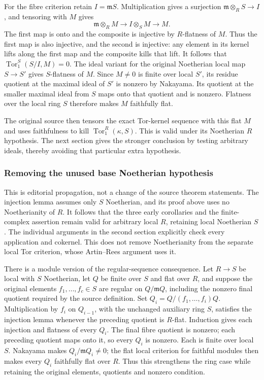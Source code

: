 For the fibre criterion retain \(I=\mathfrak mS\). Multiplication gives a surjection \(\mathfrak m\otimes_RS\to I\), and tensoring with \(M\) gives \[
\mathfrak m\otimes_RM\longrightarrow I\otimes_SM\longrightarrow M.
\] The first map is onto and the composite is injective by \(R\)-flatness of \(M\). Thus the first map is also injective, and the second is injective: any element in its kernel lifts along the first map and the composite kills that lift. It follows that \(\operatorname{Tor}_1^S(S/I,M)=0\). The ideal variant for the original Noetherian local map \(S\to S'\) gives \(S\)-flatness of \(M\). Since \(M\ne0\) is finite over local \(S'\), its residue quotient at the maximal ideal of \(S'\) is nonzero by Nakayama. Its quotient at the smaller maximal ideal from \(S\) maps onto that quotient and is nonzero. Flatness over the local ring \(S\) therefore makes \(M\) faithfully flat.

The original source then tensors the exact Tor-kernel sequence with this flat \(M\) and uses faithfulness to kill \(\operatorname{Tor}_1^R(\kappa,S)\). This is valid under its Noetherian \(R\) hypothesis. The next section gives the stronger conclusion by testing arbitrary ideals, thereby avoiding that particular extra hypothesis.

\subsubsection{Removing the unused base Noetherian hypothesis}\label{algebra-proof-016-removing-the-unused-base-noetherian-hypothesis}

This is editorial propagation, not a change of the source theorem statements. The injection lemma assumes only \(S\) Noetherian, and its proof above uses no Noetherianity of \(R\). It follows that the three early corollaries and the finite-complex assertion remain valid for arbitrary local \(R\), retaining local Noetherian \(S\). The individual arguments in the second section explicitly check every application and cokernel. This does not remove Noetherianity from the separate local Tor criterion, whose Artin--Rees argument uses it.

There is a module version of the regular-sequence consequence. Let \(R\to S\) be local with \(S\) Noetherian, let \(Q\) be finite over \(S\) and flat over \(R\), and suppose the original elements \(f_1,\ldots,f_c\in S\) are regular on \(Q/\mathfrak mQ\), including the nonzero final quotient required by the source definition. Set \(Q_i=Q/(f_1,\ldots,f_i)Q\). Multiplication by \(f_i\) on \(Q_{i-1}\), with the unchanged auxiliary ring \(S\), satisfies the injection lemma whenever the preceding quotient is \(R\)-flat. Induction gives each injection and flatness of every \(Q_i\). The final fibre quotient is nonzero; each preceding quotient maps onto it, so every \(Q_i\) is nonzero. Each is finite over local \(S\). Nakayama makes \(Q_i/\mathfrak mQ_i\ne0\); the flat local criterion for faithful modules then makes every \(Q_i\) faithfully flat over \(R\). Thus this strengthens the ring case while retaining the original elements, quotients and nonzero condition.

